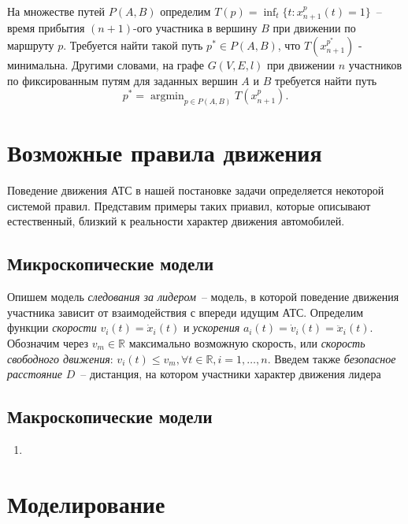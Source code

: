 \documentclass[12pt, a4paper]{article}
\DeclareMathOperator*{\argmin}{argmin}
\begin{document}
На множестве путей $P(A,B)$ определим $T(p) = \displaystyle \inf_t \{t : x^p_{n+1}(t) = 1\}$~-- время прибытия $(n+1)$-ого участника в вершину $B$ при движении по маршруту $p$. Требуется найти такой путь $p^* \in P(A, B)$, что $T(x^{p^*}_{n+1})$ - минимальна. Другими словами, на графе $G(V, E, l)$ при движении $n$ участников по фиксированным путям для заданных вершин $A$ и $B$ требуется найти путь
$$p^* = \argmin_{p \in P(A, B)} T(x^p_{n+1}).$$

\newpage
\section{Возможные правила движения}

Поведение движения АТС в нашей постановке задачи определяется некоторой системой правил. Представим примеры таких приавил, которые описывают естественный, близкий к реальности характер движения автомобилей.

\subsection{Микроскопические модели}
Опишем модель \textit{следования за лидером}~-- модель, в которой поведение движения участника зависит от взаимодействия с впереди идущим АТС. Определим функции \textit{скорости} $v_i(t) = \dot{x}_i(t)$ и \textit{ускорения} $a_i(t) = \dot{v}_i(t) = \ddot{x}_i(t)$. Обозначим через $v_m \in \mathbb {R}$ максимально возможную скорость, или \textit{скорость свободного движения}: $v_i(t) \leq v_m, \forall t \in \mathbb {R}, i = 1, \dots, n$. Введем также \textit{безопасное расстояние} $D$~-- дистанция, на котором участники  характер движения лидера  


\subsection{Макроскопические модели}
\begin{enumerate}
	\item 
	
\end{enumerate}

\newpage
\section{Моделирование}

\newpage
\end{document}
